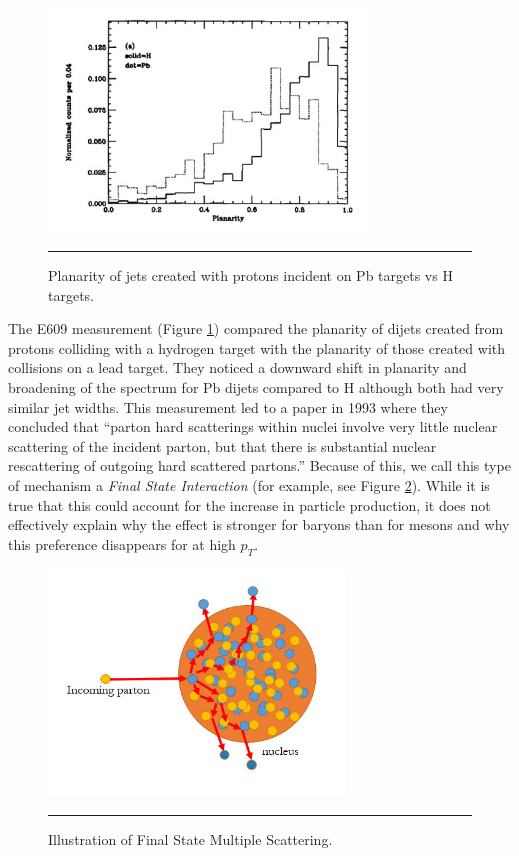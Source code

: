 \begin{figure}[h]
  \centering
    \includegraphics[width=0.75\textwidth]{prevplots/e609planarity.jpg}
    \rule{35em}{0.5pt}
  \caption[Planarity of jets created with protons incident on Pb targets vs H targets.]{Planarity of jets created with protons incident on Pb targets vs H targets.  \citep{PhysRevLett.70.143}}
  \label{fig:e609planarity}
\end{figure}
The E609 measurement (Figure \ref{fig:e609planarity}) compared the planarity of dijets created from protons colliding with a hydrogen target with the planarity of those created with collisions on a lead target. They noticed a downward shift in planarity and broadening of the spectrum for Pb dijets compared to H although both had very similar jet widths. This measurement led to a paper in 1993 where they concluded that ``parton hard scatterings within nuclei involve very little nuclear scattering of the incident parton, but that there is substantial nuclear rescattering of outgoing hard scattered partons.'' \citep{PhysRevLett.70.143} Because of this, we call this type of mechanism a \textit{Final State Interaction} (for example, see Figure \ref{fig:FSIscattering}). While it is true that this could account for the increase in particle production, it does not effectively explain why the effect is stronger for baryons than for mesons and why this preference disappears for at high $p_{T}$.
\begin{figure}[htbp!]
  \centering
    \includegraphics[width=0.7\textwidth]{Figures/FSIscattering.jpg}
   \rule{35em}{0.5pt}
  \caption[Illustration of Final State Multiple Scattering]{Illustration of Final State Multiple Scattering.}
  \label{fig:FSIscattering}
 \end{figure} 

